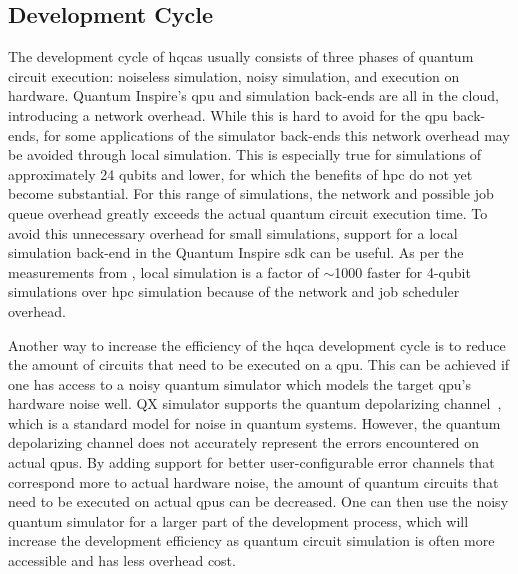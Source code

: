 \subsection{Development Cycle}
The development cycle of \glspl{hqca} usually consists of three phases of quantum circuit execution: noiseless simulation, noisy simulation, and execution on hardware.
Quantum Inspire's \gls{qpu} and simulation back-ends are all in the cloud, introducing a network overhead.
While this is hard to avoid for the \gls{qpu} back-ends, for some applications of the simulator back-ends this network overhead may be avoided through local simulation.
This is especially true for simulations of approximately 24 qubits and lower, for which the benefits of \gls{hpc} do not yet become substantial.
For this range of simulations, the network and possible job queue overhead greatly exceeds the actual quantum circuit execution time.
To avoid this unnecessary overhead for small simulations, support for a local simulation back-end in the Quantum Inspire \gls{sdk} can be useful.
As per the measurements from , local simulation is a factor of $\sim$1000 faster for 4-qubit simulations over \gls{hpc} simulation because of the network and job scheduler overhead.

Another way to increase the efficiency of the \gls{hqca} development cycle is to reduce the amount of circuits that need to be executed on a \gls{qpu}.
This can be achieved if one has access to a noisy quantum simulator which models the target \gls{qpu}'s hardware noise well.
QX simulator supports the quantum depolarizing channel~\cite[Section 8.3.4]{nielsen2002quantum}, which is a standard model for noise in quantum systems.
However, the quantum depolarizing channel does not accurately represent the errors encountered on actual \glspl{qpu}.
By adding support for better user-configurable error channels that correspond more to actual hardware noise, the amount of quantum circuits that need to be executed on actual \glspl{qpu} can be decreased.
One can then use the noisy quantum simulator for a larger part of the development process, which will increase the development efficiency as quantum circuit simulation is often more accessible and has less overhead cost.

